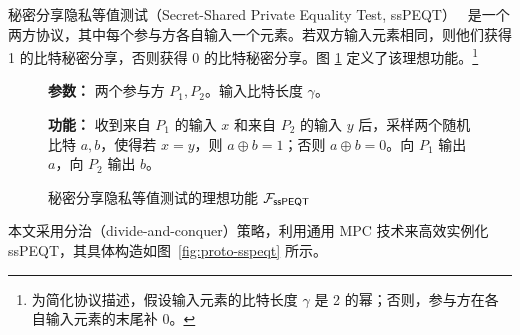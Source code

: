 秘密分享隐私等值测试（Secret-Shared Private Equality Test, ssPEQT）~\cite{PSTY-EUROCRYPT-2019,CGS22} 是一个两方协议，其中每个参与方各自输入一个元素。若双方输入元素相同，则他们获得 1 的比特秘密分享，否则获得 0 的比特秘密分享。图 \ref{fig:func-sspeqt} 定义了该理想功能。\footnote{为简化协议描述，假设输入元素的比特长度 $\gamma$ 是 2 的幂；否则，参与方在各自输入元素的末尾补 0。}

\begin{figure}[!htb]
\begin{framed}
\begin{minipage}[c]{\textwidth}
\begin{trivlist}
\item \textbf{参数：} 两个参与方 $P_1, P_2$。输入比特长度 $\gamma$。
\item \textbf{功能：} 收到来自 $P_1$ 的输入 $x$ 和来自 $P_2$ 的输入 $y$ 后，采样两个随机比特 $a, b$，使得若 $x = y$，则 $a \oplus b = 1$；否则 $a \oplus b = 0$。向 $P_1$ 输出 $a$，向 $P_2$ 输出 $b$。
\end{trivlist}
\end{minipage}
\end{framed}
\caption{秘密分享隐私等值测试的理想功能 $\mathcal{F}_\mathsf{ssPEQT}$}\label{fig:func-sspeqt}
\end{figure}

本文采用分治（divide-and-conquer）策略，利用通用 MPC 技术来高效实例化 ssPEQT，其具体构造如图~\ref{fig:proto-sspeqt} 所示。

